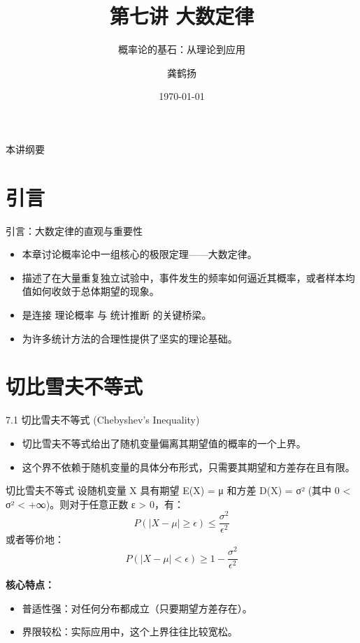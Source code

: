 \documentclass[UTF8]{beamer} %
\title{第七讲 大数定律}
\subtitle{概率论的基石：从理论到应用} %
\author{龚鹤扬}
\institute{上海芯梯科技有限公司} %
\date{\today}
\begin{document}
\frame{\titlepage}

\begin{frame}{本讲纲要}
    \tableofcontents
\end{frame}

\section{引言}
\begin{frame}{引言：大数定律的直观与重要性}
    \begin{itemize}
        \item 本章讨论概率论中一组核心的极限定理——\alert{大数定律}。
        \pause
        \item 描述了在大量重复独立试验中，事件发生的\alert{频率}如何逼近其\alert{概率}，或者\alert{样本均值}如何收敛于\alert{总体期望}的现象。
        \pause
        \item 是连接 \alert{理论概率} 与 \alert{统计推断} 的关键桥梁。
        \pause
        \item 为许多统计方法的合理性提供了坚实的理论基础。
    \end{itemize}
\end{frame}

\section{切比雪夫不等式}
\begin{frame}{7.1 切比雪夫不等式 (Chebyshev's Inequality)}
    \begin{itemize}
        \item 切比雪夫不等式给出了随机变量偏离其期望值的概率的一个\alert{上界}。
        \item 这个界不依赖于随机变量的具体分布形式，只需要其\alert{期望}和\alert{方差}存在且有限。
    \end{itemize}
    \pause
    \begin{block}{切比雪夫不等式}
        设随机变量 X 具有期望 E(X) = μ 和方差 D(X) = σ² (其中 0 < σ² < +∞)。则对于任意正数 ε > 0，有：
        \[ P(|X - \mu| \geq \epsilon) \leq \frac{\sigma^2}{\epsilon^2} \]
        或者等价地：
        \[ P(|X - \mu| < \epsilon) \geq 1 - \frac{\sigma^2}{\epsilon^2} \]
    \end{block}
    \pause
    \textbf{核心特点：}
    \begin{itemize}
        \item \alert{普适性强}：对任何分布都成立（只要期望方差存在）。
        \item \alert{界限较松}：实际应用中，这个上界往往比较宽松。
    \end{itemize}
\end{frame}
\end{document}

